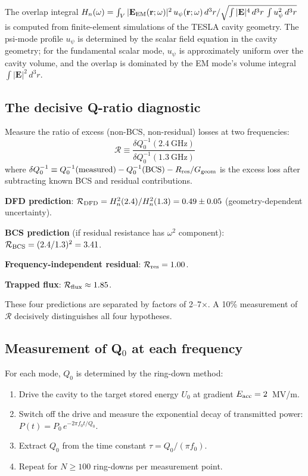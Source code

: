 \documentclass[11pt]{article}
\newcommand{\Heff}{H_n}
\begin{document}
\noindent The overlap integral $\Heff(\omega) = \int_V |\mathbf{E}_{\rm EM}
(\mathbf{r};\omega)|^2\,u_\psi(\mathbf{r};\omega)\,d^3r / \sqrt{\int
|\mathbf{E}|^4\,d^3r\,\int u_\psi^2\,d^3r}$ is computed from finite-element
simulations of the TESLA cavity geometry. The psi-mode profile $u_\psi$
is determined by the scalar field equation in the cavity geometry; for
the fundamental scalar mode, $u_\psi$ is approximately uniform over the
cavity volume, and the overlap is dominated by the EM mode's volume
integral $\int |\mathbf{E}|^2\,d^3r$.

\subsection{The decisive Q-ratio diagnostic}

\begin{tcolorbox}[colback=yellow!10!white, colframe=sqmsgold,
  title=\textbf{THE KEY MEASUREMENT}]
Measure the ratio of excess (non-BCS, non-residual) losses at two
frequencies:
\begin{equation}
\boxed{
\mathcal{R} \equiv \frac{\delta Q_0^{-1}(2.4~\text{GHz})}
{\delta Q_0^{-1}(1.3~\text{GHz})}
}
\end{equation}
where $\delta Q_0^{-1} \equiv Q_0^{-1}(\text{measured}) -
Q_0^{-1}(\text{BCS}) - R_{\rm res}/G_{\rm geom}$ is the excess loss
after subtracting known BCS and residual contributions.

\textbf{DFD prediction}: $\mathcal{R}_{\rm DFD} = \Heff^2(2.4)/
\Heff^2(1.3) = 0.49 \pm 0.05$ (geometry-dependent uncertainty).

\textbf{BCS prediction} (if residual resistance has $\omega^2$ component):
$\mathcal{R}_{\rm BCS} = (2.4/1.3)^2 = 3.41$.

\textbf{Frequency-independent residual}: $\mathcal{R}_{\rm res} = 1.00$.

\textbf{Trapped flux}: $\mathcal{R}_{\rm flux} \approx 1.85$.

These four predictions are separated by factors of 2--7$\times$. A
10\% measurement of $\mathcal{R}$ decisively distinguishes all four
hypotheses.
\end{tcolorbox}

\subsection{Measurement of Q$_0$ at each frequency}

For each mode, $Q_0$ is determined by the ring-down method:
\begin{enumerate}[nosep]
\item Drive the cavity to the target stored energy $U_0$ at gradient
  $E_{\rm acc} = 2$~MV/m.
\item Switch off the drive and measure the exponential decay of transmitted
  power: $P(t) = P_0\,e^{-2\pi f_0 t/Q_0}$.
\item Extract $Q_0$ from the time constant $\tau = Q_0/(\pi f_0)$.
\item Repeat for $N \geq 100$ ring-downs per measurement point.
\end{enumerate}
\end{document}

